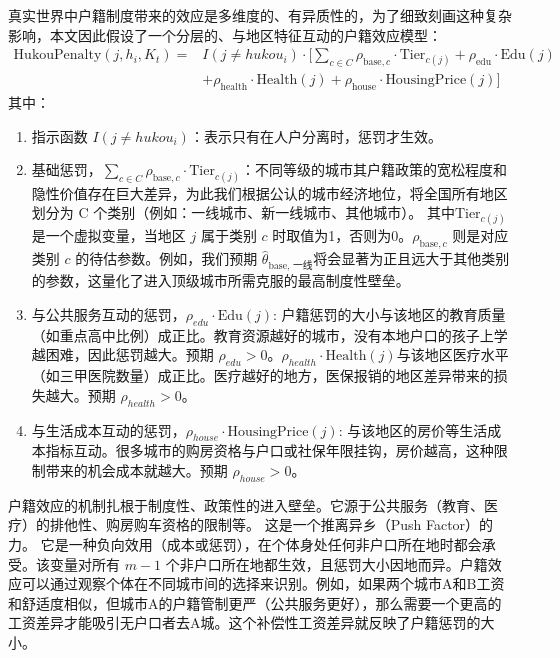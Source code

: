 \documentclass[
  a4paper,
  zihao=-4,
  fontset=mac,
  AutoFakeBold,
  AutoFakeSlant,
  oneside]{ctexbook}
\begin{document}
真实世界中户籍制度带来的效应是多维度的、有异质性的，为了细致刻画这种复杂影响，本文因此假设了一个分层的、与地区特征互动的户籍效应模型：
\begin{equation}
    \begin{split}
        \text{HukouPenalty}(j, h_i, K_t) ={}& I(j \neq hukou_i) \cdot \bigl[ \sum\limits_{c \in C} \rho_{\text{base}, c} \cdot \text{Tier}_{c(j)}+ \rho_{\text{edu}} \cdot \text{Edu}(j) \\
        & + \rho_{\text{health}} \cdot \text{Health}(j) + \rho_{\text{house}} \cdot \text{HousingPrice}(j) \bigr]
    \end{split}
\label{户籍惩罚函数}
\end{equation}
其中：
\begin{enumerate}
  \item 指示函数 $I(j \neq hukou_i)$：表示只有在人户分离时，惩罚才生效。

  \item 基础惩罚，$\sum\limits_{c \in C} \rho_{\text{base}, c} \cdot \text{Tier}_{c(j)}$：不同等级的城市其户籍政策的宽松程度和隐性价值存在巨大差异，为此我们根据公认的城市经济地位，将全国所有地区划分为 C 个类别（例如：一线城市、新一线城市、其他城市）。
  其中$\text{Tier}_{c(j)}$是一个虚拟变量，当地区 $j$ 属于类别 $c$ 时取值为1，否则为0。$\rho_{\text{base}, c}$ 则是对应类别 $c$ 的待估参数。例如，我们预期 $\hat{\theta}_{\text{base, 一线}}$将会显著为正且远大于其他类别的参数，这量化了进入顶级城市所需克服的最高制度性壁垒。

  \item 与公共服务互动的惩罚，$\rho_{edu} \cdot \text{Edu}(j)$: 户籍惩罚的大小与该地区的教育质量（如重点高中比例）成正比。教育资源越好的城市，没有本地户口的孩子上学越困难，因此惩罚越大。预期 $\rho_{edu} > 0$。$\rho_{health} \cdot \text{Health}(j)$与该地区医疗水平（如三甲医院数量）成正比。医疗越好的地方，医保报销的地区差异带来的损失越大。预期 $\rho_{health} > 0$。

  \item 与生活成本互动的惩罚，$\rho_{house} \cdot \text{HousingPrice}(j)$: 与该地区的房价等生活成本指标互动。很多城市的购房资格与户口或社保年限挂钩，房价越高，这种限制带来的机会成本就越大。预期 $\rho_{house} > 0$。
\end{enumerate}


户籍效应的机制扎根于制度性、政策性的进入壁垒。它源于公共服务（教育、医疗）的排他性、购房购车资格的限制等。
这是一个推离异乡（Push Factor）的力。
它是一种负向效用（成本或惩罚），在个体身处任何非户口所在地时都会承受。该变量对所有 $m-1$ 个非户口所在地都生效，且惩罚大小因地而异。户籍效应可以通过观察个体在不同城市间的选择来识别。例如，如果两个城市A和B工资和舒适度相似，但城市A的户籍管制更严（公共服务更好），那么需要一个更高的工资差异才能吸引无户口者去A城。这个补偿性工资差异就反映了户籍惩罚的大小。
\end{document}
